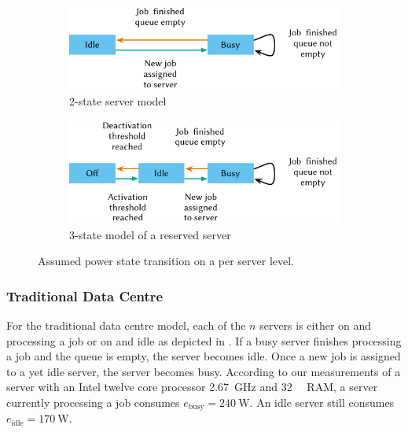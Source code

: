 \begin{figure}
	\begin{subfigure}[b]{\textwidth}
	\centering
	\includegraphics{cloud/data_centers/problem_formulation/figures/idle_busy}
	\caption{2-state server model}\label{fig:cloud:data_centers:problem_formulation:servers:idle_busy}
	\end{subfigure} 
	\begin{subfigure}[b]{\textwidth}
	\centering
	\includegraphics{cloud/data_centers/problem_formulation/figures/idle_busy_off}
	\caption{3-state model of a reserved server}\label{fig:cloud:data_centers:problem_formulation:idle_busy_off}
	\end{subfigure}

	\caption{Assumed power state transition on a per server level.}\label{fig:cloud:data_centers:problem_formulation:servers}
\end{figure}

\subsubsection*{Traditional Data Centre}\label{sec:cloud:data_centers:problem_formulation:default_data_center}
For the traditional data centre model, each of the \(n\) servers is either on and processing a job or on and idle as depicted in .
If a busy server finishes processing a job and the queue is empty, the server becomes idle. Once a new job is assigned to a yet idle server, the server becomes busy.
According to our measurements of a server with an Intel twelve core processor \SI{2.67}{\giga\hertz} and \SI{32}{\giga\byte} RAM, a server currently processing a job consumes \(e_{\text{busy}} = \SI{240}{\watt}\).
An idle server still consumes \(e_{\text{idle}} = \SI{170}{\watt}\).

